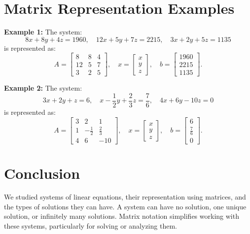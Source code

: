 \documentclass{article}
\begin{document}
\section*{Matrix Representation Examples}

\textbf{Example 1:}
The system:
\[
  8x + 8y + 4z = 1960, \quad 12x + 5y + 7z = 2215, \quad 3x + 2y + 5z = 1135
\]
is represented as:
\[
  A =
  \begin{bmatrix}
    8 & 8 & 4 \\
    12 & 5 & 7 \\
    3 & 2 & 5
  \end{bmatrix},
  \quad
  x =
  \begin{bmatrix}
    x \\
    y \\
    z
  \end{bmatrix},
  \quad
  b =
  \begin{bmatrix}
    1960 \\
    2215 \\
    1135
  \end{bmatrix}.
\]

\textbf{Example 2:}
The system:
\[
  3x + 2y + z = 6, \quad x - \frac{1}{2}y + \frac{2}{3}z = \frac{7}{6}, \quad 4x + 6y - 10z = 0
\]
is represented as:
\[
  A =
  \begin{bmatrix}
    3 & 2 & 1 \\
    1 & -\frac{1}{2} & \frac{2}{3} \\
    4 & 6 & -10
  \end{bmatrix},
  \quad
  x =
  \begin{bmatrix}
    x \\
    y \\
    z
  \end{bmatrix},
  \quad
  b =
  \begin{bmatrix}
    6 \\
    \frac{7}{6} \\
    0
  \end{bmatrix}.
\]

\section*{Conclusion}

We studied systems of linear equations, their representation using matrices, and the types of solutions they can have. A system can have no solution, one unique solution, or infinitely many solutions. Matrix notation simplifies working with these systems, particularly for solving or analyzing them.
\end{document}
